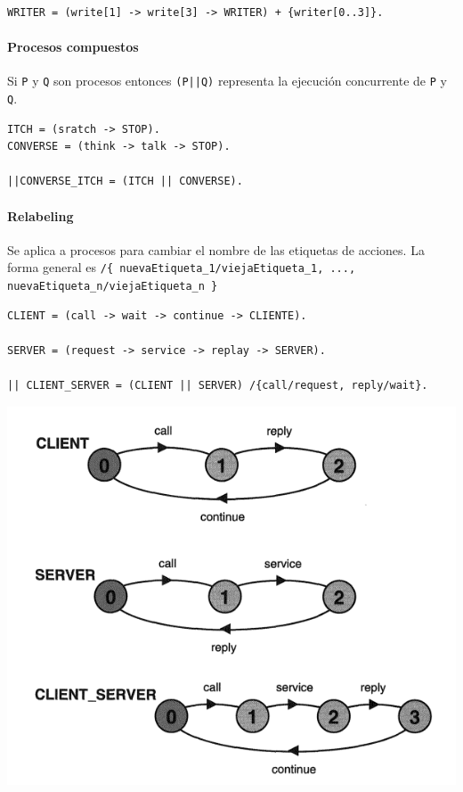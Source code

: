 \begin{verbatim}
WRITER = (write[1] -> write[3] -> WRITER) + {writer[0..3]}.
\end{verbatim}

\paragraph{Procesos compuestos}
Si \texttt{P} y \texttt{Q} son procesos entonces \texttt{(P||Q)} representa la ejecución concurrente de \texttt{P} y \texttt{Q}.

\begin{verbatim}
ITCH = (sratch -> STOP).
CONVERSE = (think -> talk -> STOP).

||CONVERSE_ITCH = (ITCH || CONVERSE).
\end{verbatim}

\paragraph{Relabeling}
Se aplica a procesos para cambiar el nombre de las etiquetas de acciones. La forma general es \texttt{/\{ nuevaEtiqueta\_1/viejaEtiqueta\_1, ..., nuevaEtiqueta\_n/viejaEtiqueta\_n \}}

\begin{verbatim}
CLIENT = (call -> wait -> continue -> CLIENTE).

SERVER = (request -> service -> replay -> SERVER).

|| CLIENT_SERVER = (CLIENT || SERVER) /{call/request, reply/wait}.
\end{verbatim}

\begin{center}
\includegraphics[scale=0.5]{imagenes/lts-clientServer}
\end{center}
